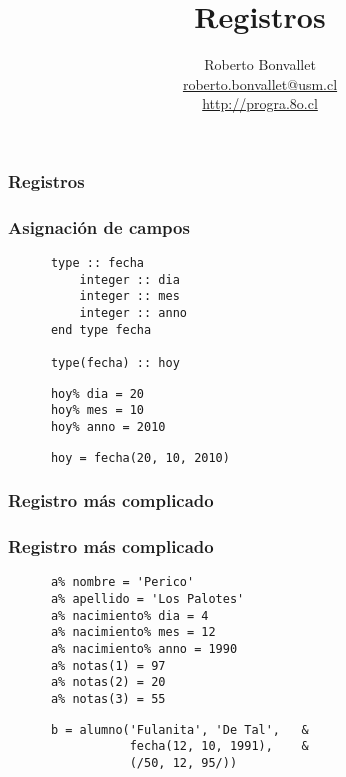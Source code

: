 \documentclass[12pt]{beamer}
\title{Registros}
\author{
  Roberto Bonvallet \\
  \url{roberto.bonvallet@usm.cl} \\
  \url{http://progra.8o.cl}
}
\begin{document}
  \begin{frame}
    \maketitle
  \end{frame}

  \begin{frame}
    \frametitle{Registros}

    \pause
    \vspace{2em}
    

  \end{frame}

  \begin{frame}[fragile]
    \frametitle{Asignación de campos}
    \begin{lstlisting}
      type :: fecha
          integer :: dia
          integer :: mes
          integer :: anno
      end type fecha

      type(fecha) :: hoy
    \end{lstlisting}
    \pause
    \begin{lstlisting}
      hoy% dia = 20
      hoy% mes = 10
      hoy% anno = 2010
\end{lstlisting}
\pause
    \begin{lstlisting}
      hoy = fecha(20, 10, 2010)
    \end{lstlisting}


\end{frame}

  \begin{frame}
    \frametitle{Registro más complicado}
    
  \end{frame}

  \begin{frame}[fragile]
    \frametitle{Registro más complicado}
    \begin{lstlisting}
      a% nombre = 'Perico'
      a% apellido = 'Los Palotes'
      a% nacimiento% dia = 4
      a% nacimiento% mes = 12
      a% nacimiento% anno = 1990
      a% notas(1) = 97
      a% notas(2) = 20
      a% notas(3) = 55
    \end{lstlisting}
    \pause
    \begin{lstlisting}
      b = alumno('Fulanita', 'De Tal',   &
                 fecha(12, 10, 1991),    &
                 (/50, 12, 95/))
    \end{lstlisting}

\end{frame}
\end{document}
